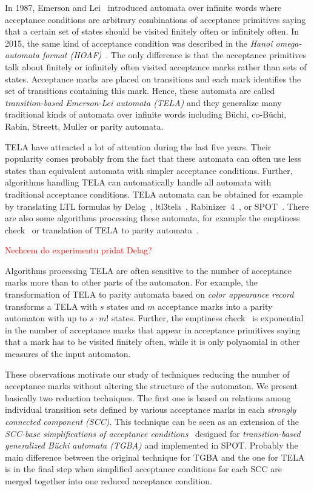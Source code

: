 \documentclass[a4paper,UKenglish,cleveref, autoref, thm-restate]{lipics-v2021}
\newcommand{\todo}[1]{\textcolor{red}{#1}}
\begin{document}
In 1987, Emerson and Lei~\cite{emerson.87.scp} introduced automata
over infinite words where acceptance conditions are arbitrary
combinations of acceptance primitives saying that a certain set of
states should be visited finitely often or infinitely often. In 2015,
the same kind of acceptance condition was described in the \emph{Hanoi
  omega-automata format (HOAF)}~\cite{babiak.15.cav}. The only
difference is that the acceptance primitives talk about finitely or
infinitely often visited acceptance marks rather than sets of states.
Acceptance marks are placed on transitions and each mark identifies
the set of transitions containing this mark. Hence, these automata are
called \emph{transition-based Emerson-Lei automata (TELA)} and they
generalize many traditional kinds of automata over infinite words
including Büchi, co-Büchi, Rabin, Streett, Muller or parity
automata.

TELA have attracted a lot of attention during the last five years.
Their popularity comes probably from the fact that these automata can
often use less states than equivalent automata with simpler acceptance
conditions. Further, algorithms handling TELA can automatically handle
all automata with traditional acceptance conditions. TELA automata can
be obtained for example by translating LTL formulas by
Delag~\cite{muller.17.gandalf}, ltl3tela~\cite{major.19.atva},
Rabinizer~4~\cite{kretinsky.18.cav}, or
SPOT~\cite{duret.16.atva2}. There are also some algorithms processing
these automata, for example the emptiness check~\cite{baier.19.atva}
or translation of TELA to parity automata~\cite{renkin.20.atva}.

\todo{Nechcem do experimentu pridat Delag?}

Algorithms processing TELA are often sensitive to the number of
acceptance marks more than to other parts of the automaton. For
example, the transformation of TELA to parity automata based on
\emph{color appearance record}~\cite{renkin.20.atva} transforms a TELA
with $s$ states and $m$ acceptance marks into a parity automaton with
up to $s\cdot m!$ states. Further, the emptiness
check~\cite{baier.19.atva} is exponential in the number of acceptance
marks that appear in acceptance primitives saying that a mark has to
be visited finitely often, while it is only polynomial in other
measures of the input automaton.

These observations motivate our study of techniques reducing the
number of acceptance marks without altering the structure of the
automaton. We present basically two reduction techniques. The first
one is based on relations among individual transition sets defined by
various acceptance marks in each \emph{strongly connected component
  (SCC)}. This technique can be seen as an extension of the
\emph{SCC-base simplifications of acceptance
  conditions}~\cite{babiak.13.spin} designed for
\emph{transition-based generalized Büchi automata (TGBA)} and
implemented in SPOT. Probably the main difference between the original
technique for TGBA and the one for TELA is in the final step when
simplified acceptance conditions for each SCC are merged together into
one reduced acceptance condition.
\end{document}
